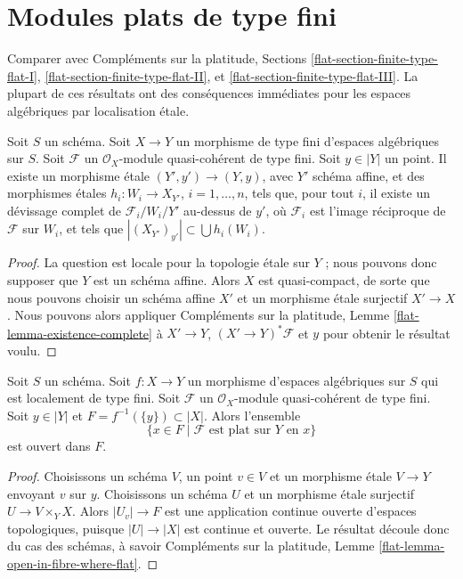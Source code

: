 \section{Modules plats de type fini}
\label{section-finite-type-flat}

\noindent
Comparer avec
Compléments sur la platitude, Sections
\ref{flat-section-finite-type-flat-I},
\ref{flat-section-finite-type-flat-II}, et
\ref{flat-section-finite-type-flat-III}.
La plupart de ces résultats ont des conséquences immédiates
pour les espaces algébriques par localisation \'etale.

\begin{lemma}
\label{lemma-existence-complete}
Soit $S$ un schéma.
Soit $X \to Y$ un morphisme de type fini d'espaces algébriques sur $S$.
Soit $\mathcal{F}$ un $\mathcal{O}_X$-module quasi-cohérent de type fini.
Soit $y \in |Y|$ un point. Il existe un morphisme \'etale
$(Y', y') \to (Y, y)$, avec $Y'$ schéma affine, et des morphismes \'etales
$h_i : W_i \to X_{Y'}$, $i = 1, \ldots, n$, tels que, pour tout
$i$, il existe un dévissage complet de $\mathcal{F}_i/W_i/Y'$ au-dessus de $y'$,
où $\mathcal{F}_i$ est l'image réciproque de $\mathcal{F}$ sur $W_i$,
et tels que $|(X_{Y'})_{y'}| \subset \bigcup h_i(W_i)$.
\end{lemma}

\begin{proof}
La question est locale pour la topologie \'etale sur $Y$ ; nous pouvons donc supposer que $Y$
est un schéma affine. Alors $X$ est quasi-compact, de sorte que nous pouvons
choisir un schéma affine $X'$ et un morphisme \'etale surjectif
$X' \to X$. Nous pouvons alors appliquer
Compléments sur la platitude, Lemme \ref{flat-lemma-existence-complete}
à $X' \to Y$, $(X' \to Y)^*\mathcal{F}$ et $y$ pour
obtenir le résultat voulu.
\end{proof}

\begin{lemma}
\label{lemma-open-in-fibre-where-flat}
Soit $S$ un schéma.
Soit $f : X \to Y$ un morphisme d'espaces algébriques sur $S$
qui est localement de type fini.
Soit $\mathcal{F}$ un $\mathcal{O}_X$-module quasi-cohérent de type fini.
Soit $y \in |Y|$ et $F = f^{-1}(\{y\}) \subset |X|$. Alors l'ensemble
$$
\{x \in F \mid \mathcal{F} \text{ est plat sur }Y\text{ en }x\}
$$
est ouvert dans $F$.
\end{lemma}

\begin{proof}
Choisissons un schéma $V$, un point $v \in V$ et un morphisme \'etale $V \to Y$
envoyant $v$ sur $y$. Choisissons un schéma $U$ et un morphisme \'etale surjectif
$U \to V \times_Y X$. Alors $|U_v| \to F$ est une application continue ouverte
d'espaces topologiques, puisque $|U| \to |X|$ est continue et ouverte.
Le résultat découle donc du cas des schémas, à savoir
Compléments sur la platitude, Lemme \ref{flat-lemma-open-in-fibre-where-flat}.
\end{proof}

